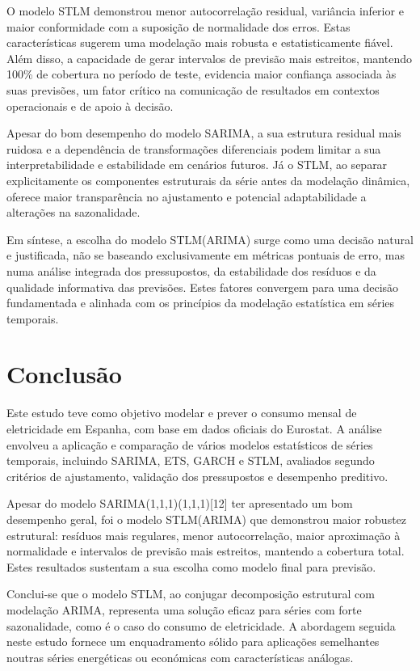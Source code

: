 \documentclass[journal]{IEEEtran}
\begin{document}
O modelo STLM demonstrou menor autocorrelação residual, variância inferior e maior conformidade com a suposição de normalidade dos erros. Estas características sugerem uma modelação mais robusta e estatisticamente fiável. Além disso, a capacidade de gerar intervalos de previsão mais estreitos, mantendo 100\% de cobertura no período de teste, evidencia maior confiança associada às suas previsões, um fator crítico na comunicação de resultados em contextos operacionais e de apoio à decisão.

Apesar do bom desempenho do modelo SARIMA, a sua estrutura residual mais ruidosa e a dependência de transformações diferenciais podem limitar a sua interpretabilidade e estabilidade em cenários futuros. Já o STLM, ao separar explicitamente os componentes estruturais da série antes da modelação dinâmica, oferece maior transparência no ajustamento e potencial adaptabilidade a alterações na sazonalidade.

Em síntese, a escolha do modelo STLM(ARIMA) surge como uma decisão natural e justificada, não se baseando exclusivamente em métricas pontuais de erro, mas numa análise integrada dos pressupostos, da estabilidade dos resíduos e da qualidade informativa das previsões. Estes fatores convergem para uma decisão fundamentada e alinhada com os princípios da modelação estatística em séries temporais.

\section{Conclusão}

Este estudo teve como objetivo modelar e prever o consumo mensal de eletricidade em Espanha, com base em dados oficiais do Eurostat. A análise envolveu a aplicação e comparação de vários modelos estatísticos de séries temporais, incluindo SARIMA, ETS, GARCH e STLM, avaliados segundo critérios de ajustamento, validação dos pressupostos e desempenho preditivo.

Apesar do modelo SARIMA(1,1,1)(1,1,1)[12] ter apresentado um bom desempenho geral, foi o modelo STLM(ARIMA) que demonstrou maior robustez estrutural: resíduos mais regulares, menor autocorrelação, maior aproximação à normalidade e intervalos de previsão mais estreitos, mantendo a cobertura total. Estes resultados sustentam a sua escolha como modelo final para previsão.

Conclui-se que o modelo STLM, ao conjugar decomposição estrutural com modelação ARIMA, representa uma solução eficaz para séries com forte sazonalidade, como é o caso do consumo de eletricidade. A abordagem seguida neste estudo fornece um enquadramento sólido para aplicações semelhantes noutras séries energéticas ou económicas com características análogas.



\end{document}
